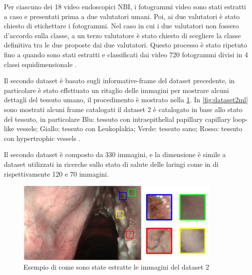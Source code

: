 Per ciascuno dei 18 video endoscopici NBI, i fotogrammi video sono stati estratti a caso e
presentati prima a due valutatori umani. Poi, ai due valutatori è stato chiesto di etichettare i fotogrammi. Nel caso in cui i due
valutatori non fossero d'accordo sulla classe, a un terzo valutatore è stato
chiesto di scegliere la classe definitiva tra le due proposte
dai due valutatori. Questo processo è stato ripetuto fino a quando sono stati estratti e classificati dai video 720 fotogrammi divisi in 4 classi equidimensionale \cite{moccia_larynge}.

Il secondo dataset è basato sugli informative-frame del dataset precedente, in particolare è stato effettuato un ritaglio delle immagini per mostrare   alcuni dettagli del tessuto umano, il procedimento è mostrato nella \cref{fig:dataset2}. In \cref{fig:dataset2ml} sono mostrati alcuni frame catalogati il dataset 2 è catalogato in base allo stato del tessuto, in particolare Blu: tessuto con intraepithelial papillary capillary loop-like vessels; Giallo: tessuto con Leukoplakia;
Verde: tessuto sano; Rosso: tessuto con hypertrophic vessels \cite{moccia_larynge}.

Il secondo dataset è composto da 330 immagini, e la dimensione è simile a dataset utilizzati in ricerche sullo stato di salute delle laringi come in \cite{narbalata_larynge} \cite{turkmen_larynge} di rispettivamente 120 e 70 immagini.

\begin{figure}[ht]
    \centering
    \includegraphics[width=0.9\textwidth]{introduzione/dataset-2.JPG}
    \caption{Esempio di come sono state estratte le immagini del dataset 2}
    \label{fig:dataset2}
\end{figure}

